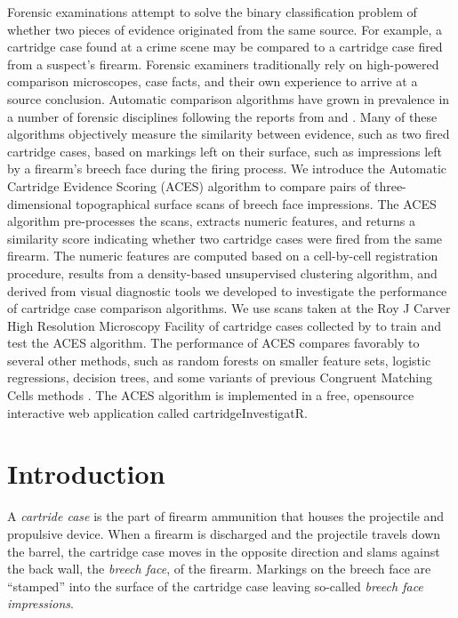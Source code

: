 \documentclass[11pt,]{isuthesis}
\begin{document}
Forensic examinations attempt to solve the binary classification problem of whether two pieces of evidence originated from the same source.
For example, a cartridge case found at a crime scene may be compared to a cartridge case fired from a suspect's firearm.
Forensic examiners traditionally rely on high-powered comparison microscopes, case facts, and their own experience to arrive at a source conclusion.
Automatic comparison algorithms have grown in prevalence in a number of forensic
disciplines following the reports from \citet{council_strengthening_2009} and \citet{pcast2016}.
Many of these algorithms objectively measure the similarity between evidence, such as two fired cartridge cases, based on markings left on their surface, such as impressions left by a firearm's breech face during the firing process.
We introduce the Automatic Cartridge Evidence Scoring (ACES) algorithm to compare pairs of three-dimensional topographical surface scans of breech face impressions.
The ACES algorithm pre-processes the scans, extracts numeric features, and returns a similarity score indicating whether two cartridge cases were fired from the same firearm.
The numeric features are computed based on a cell-by-cell registration procedure, results from a density-based unsupervised clustering algorithm, and derived from visual diagnostic tools we developed to investigate the performance of cartridge case comparison algorithms.
We use scans taken at the Roy J Carver High Resolution Microscopy Facility of cartridge cases collected by \citet{Baldwin2014} to train and test the ACES algorithm.
The performance of ACES compares favorably to several other methods, such as random forests on smaller feature sets, logistic regressions, decision trees, and some variants of previous Congruent Matching Cells methods \citep{song_proposed_2013, Zhang2020}.
The ACES algorithm is implemented in a free, opensource interactive web application called cartridgeInvestigatR.

\hypertarget{introduction-1}{%
\section{Introduction}\label{introduction-1}}

A \emph{cartride case} is the part of firearm ammunition that houses the projectile and propulsive device.
When a firearm is discharged and the projectile travels down the barrel, the cartridge case moves in the opposite direction and slams against the back wall, the \emph{breech face}, of the firearm.
Markings on the breech face are ``stamped'' into the surface of the cartridge case leaving so-called \emph{breech face impressions}.
\end{document}
